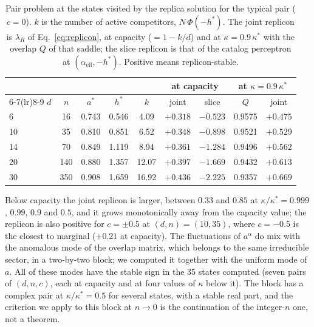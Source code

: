 \begin{table}[h]
\caption{Pair problem at the states visited by the replica solution for the typical pair ($c=0$). $k$ is the number of active competitors, $N\,\Phi(-h^*)$. The joint replicon is $\lambda_R$ of Eq.~\eqref{eq:replicon}, at capacity ($=1-k/d$) and at $\kappa=0.9\,\kappa^*$ with the overlap $Q$ of that saddle; the slice replicon is that of the catalog perceptron at $(\alpha_{\mathrm{eff}},-h^*)$. Positive means replicon-stable.}
\label{tab:replicon}
\centering
\small
\begin{tabular}{lcccccccc}
\toprule
 & & & & & \multicolumn{2}{c}{at capacity} & \multicolumn{2}{c}{at $\kappa=0.9\,\kappa^*$} \\
\cmidrule(lr){6-7}\cmidrule(lr){8-9}
$d$ & $n$ & $a^*$ & $h^*$ & $k$ & joint & slice & $Q$ & joint \\
\midrule
6 & 16 & 0.743 & 0.546 & 4.09 & $+0.318$ & $-0.523$ & 0.9575 & $+0.475$ \\
10 & 35 & 0.810 & 0.851 & 6.52 & $+0.348$ & $-0.898$ & 0.9521 & $+0.529$ \\
14 & 70 & 0.849 & 1.119 & 8.94 & $+0.361$ & $-1.284$ & 0.9496 & $+0.562$ \\
20 & 140 & 0.880 & 1.357 & 12.07 & $+0.397$ & $-1.669$ & 0.9432 & $+0.613$ \\
30 & 350 & 0.908 & 1.659 & 16.92 & $+0.436$ & $-2.225$ & 0.9357 & $+0.669$ \\
\bottomrule
\end{tabular}
\end{table}

Below capacity the joint replicon is larger, between $0.33$ and $0.85$ at $\kappa/\kappa^*=0.999$, $0.99$, $0.9$ and $0.5$, and it grows monotonically away from the capacity value; the replicon is also positive for $c=\pm0.5$ at $(d,n)=(10,35)$, where $c=-0.5$ is the closest to marginal ($+0.21$ at capacity). The fluctuations of $a^\alpha$ do mix with the anomalous mode of the overlap matrix, which belongs to the same irreducible sector, in a two-by-two block; we computed it together with the uniform mode of $a$. All of these modes have the stable sign in the 35 states computed (seven pairs of $(d,n,c)$, each at capacity and at four values of $\kappa$ below it). The block has a complex pair at $\kappa/\kappa^*=0.5$ for several states, with a stable real part, and the criterion we apply to this block at $n\to0$ is the continuation of the integer-$n$ one, not a theorem.

